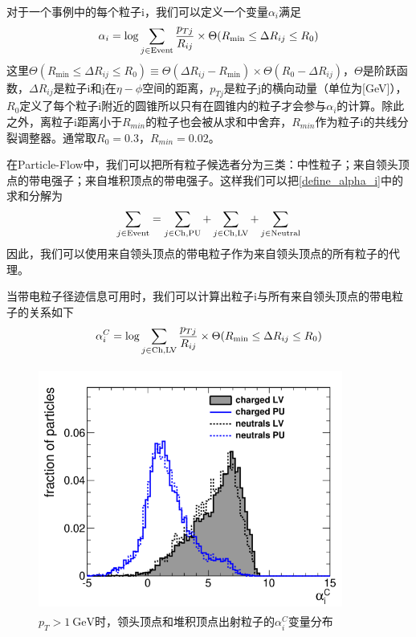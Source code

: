 对于一个事例中的每个粒子i，我们可以定义一个变量$\alpha_i$满足
\begin{equation}\label{define_alpha_i}
    \alpha_{i}=\log\sum_{\begin{subarray}{c}j\in{\text{Event}}\end{subarray}}\frac{p_{Tj}}{R_{ij}}\times\Theta(R_{\text{min}}\leq\Delta R_{ij}\leq R_{0})
\end{equation}
这里$\Theta(R_{\text{min}}\leq\Delta R_{ij}\leq R_{0})\equiv\Theta(\Delta R_{ij}-R_{\text{min}})\times\Theta(R_{0}-\Delta R_{ij})$，$\Theta$是阶跃函数，$\Delta R_{ij}$是粒子i和j在$\eta - \phi$空间的距离，$p_{Tj}$是粒子j的横向动量（单位为[GeV]），$R_0$定义了每个粒子i附近的圆锥所以只有在圆锥内的粒子才会参与$\alpha_i$的计算。除此之外，离粒子i距离小于$R_{min}$的粒子也会被从求和中舍弃，$R_{min}$作为粒子i的共线分裂调整器。通常取$R_0=0.3$，$R_{min}=0.02$。

在Particle-Flow中，我们可以把所有粒子候选者分为三类：中性粒子；来自领头顶点的带电强子；来自堆积顶点的带电强子。这样我们可以把\eqref{define_alpha_i}中的求和分解为
\begin{equation}
    \sum_{j\in\rm Event}=\sum_{j\in\rm Ch,PU}+\sum_{j\in\rm Ch,LV}+\sum_{j\in\rm Neutral}
\end{equation}
因此，我们可以使用来自领头顶点的带电粒子作为来自领头顶点的所有粒子的代理。

当带电粒子径迹信息可用时，我们可以计算出粒子i与所有来自领头顶点的带电粒子的关系如下
\begin{equation}
    \alpha_{i}^C=\log\sum_{\begin{subarray}{c}j\in{\text{Ch,LV}}\end{subarray}}\frac{p_{Tj}}{R_{ij}}\times\Theta(R_{\text{min}}\leq\Delta R_{ij}\leq R_{0})
\end{equation}

\begin{figure}[H]
 \centering\label{fig:3.2}
 \caption{$p_{T}>1~{}\mathrm{GeV}$时，领头顶点和堆积顶点出射粒子的$\alpha^C_i$变量分布\cite{Pileup_Per_Particle_Identification}}
 \includegraphics[height=8cm, width=10cm]{pictures/puppi_aC.png}
\end{figure}

